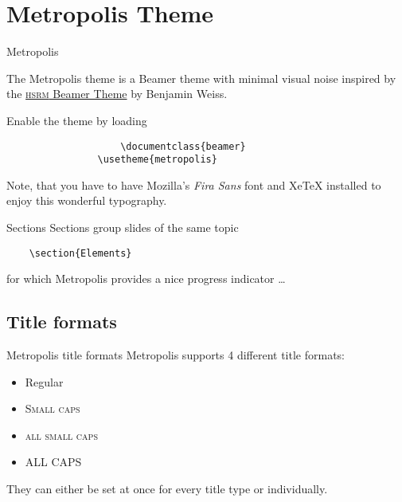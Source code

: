 \section{Metropolis Theme}

	\begin{frame}[fragile]{Metropolis}
	
		The Metropolis theme is a Beamer theme with minimal visual noise
		inspired by the \href{https://github.com/hsrmbeamertheme/hsrmbeamertheme}{\textsc{hsrm} Beamer
		Theme} by Benjamin Weiss.
		
		Enable the theme by loading
		
		\begin{verbatim}
			  		\documentclass{beamer}
			   	\usetheme{metropolis}
		\end{verbatim}
		
		Note, that you have to have Mozilla's \emph{Fira Sans} font and XeTeX
		installed to enjoy this wonderful typography.
	\end{frame}

	\begin{frame}[fragile]{Sections}
		Sections group slides of the same topic
		
		\begin{verbatim}    \section{Elements}\end{verbatim}
		
		for which Metropolis provides a nice progress indicator \ldots
	\end{frame}

\subsection{Title formats}

	\begin{frame}{Metropolis title formats}
		Metropolis supports 4 different title formats:
		\begin{itemize}
			\item Regular
			\item \textsc{Small caps}
			\item \textsc{all small caps}
			\item ALL CAPS
		\end{itemize}
		They can either be set at once for every title type or individually.
	\end{frame}

